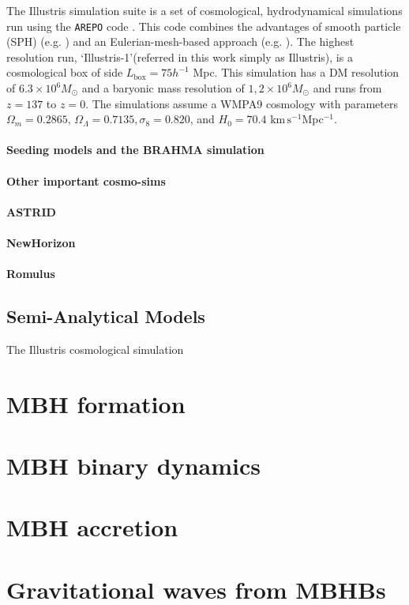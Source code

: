 \documentclass{book}
\newcommand{\kms}{\ensuremath{\mathrm{km\,s^{-1}}}}
\begin{document}
The Illustris simulation suite is a set of cosmological, hydrodynamical simulations run using the {\tt AREPO}  code \citep{Springel_2010}. This code combines the advantages of smooth particle (SPH) (e.g. \citep{Gingold97, Lucy1997}) and an Eulerian-mesh-based approach (e.g. \citep{BERGER198964}). The highest resolution run, `Illustris-1'(referred in this work simply as Illustris), is a cosmological box of side $L_{\text{box}} = 75 h^{-1}$ Mpc. This simulation has a DM resolution of $6.3 \times 10^6 M_{\odot}$ and a baryonic mass resolution of $1,2 \times 10^6 M_{\odot}$ and runs from $z=137$ to $z=0$. The simulations assume a WMPA9 cosmology \citep{Hinshaw_2013} with parameters $\Omega_m = 0.2865$, $\Omega_{\Lambda} = 0.7135, \sigma_{8} = 0.820$, and $H_{0} = 70.4$ \kms Mpc$^{-1}$.


\subsubsection{Seeding models and the BRAHMA simulation}


\subsubsection{Other important cosmo-sims}

\subsubsection{ASTRID}
\subsubsection{NewHorizon}

\subsubsection{Romulus}



      
\section{Semi-Analytical Models}

The Illustris cosmological simulation



\chapter{MBH formation}


\chapter{MBH binary dynamics}


\chapter{MBH accretion}

\chapter{Gravitational waves from MBHBs}




\end{document}

